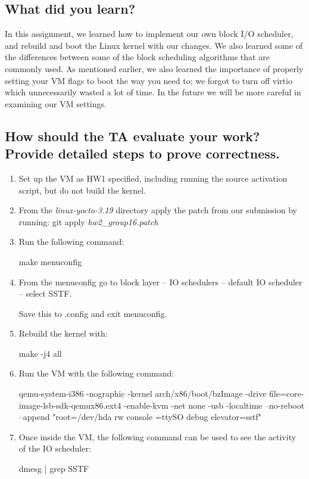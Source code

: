 \documentclass[onecolumn, draftclsnofoot,10pt, compsoc]{IEEEtran}
\begin{document}
\subsection{What did you learn?}

In this assignment, we learned how to implement our own block I/O scheduler, and rebuild and boot the Linux kernel with our changes. We also learned some of the differences between some of the block scheduling algorithms that are commonly used. As mentioned earlier, we also learned the importance of properly setting your VM flags to boot the way you need to; we forgot to turn off virtio which unnecessarily wasted a lot of time. In the future we will be more careful in examining our VM settings.

\subsection{How should the TA evaluate your work? Provide detailed steps to prove correctness.}
\begin{enumerate}
\item Set up the VM as HW1 specified, including running the source activation script, but do not build the kernel. 
\item From the \textit{linux-yocto-3.19} directory apply the patch from our submission by running:
	git apply \textit{hw2\_group16.patch}  
\item Run the following command:

  make menuconfig
\item From the menuconfig go to block layer -- IO schedulers -- default IO scheduler -- select SSTF.

  Save this to .config and exit menuconfig. 
\item Rebuild the kernel with:

  make -j4 all 
\item Run the VM with the following command:

  qemu-system-i386 -nographic -kernel arch/x86/boot/bzImage -drive file=core-image-lsb-sdk-qemux86.ext4 -enable-kvm -net none -usb -localtime --no-reboot --append "root=/dev/hda rw console =ttySO debug elevator=sstf"
\item Once inside the VM, the following command can be used to see the activity of the IO scheduler:

  dmesg | grep SSTF
\end{enumerate}




\end{document}
